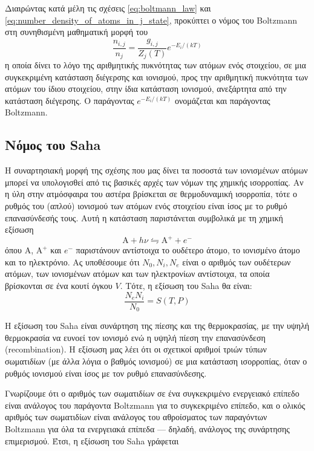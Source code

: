 Διαιρώντας κατά μέλη τις σχέσεις \eqref{eq:boltmann_law} και \eqref{eq:number_density_of_atoms_in_j_state}, προκύπτει ο νόμος του Boltzmann στη συνηθισμένη μαθηματική μορφή του
\begin{equation}
    \label{eq:boltzmann_law_general}
    \frac{n_{i,j}}{n_j} = \frac{g_{i,j}}{Z_{j}(T)} e^{-E_i/(kT)}
\end{equation}
η οποία δίνει το λόγο της αριθμητικής πυκνότητας των ατόμων ενός στοιχείου, σε μια συγκεκριμένη κατάσταση διέγερσης και ιονισμού, προς την αριθμητική πυκνότητα των ατόμων του ίδιου στοιχείου, στην ίδια κατάσταση ιονισμού, ανεξάρτητα από την κατάσταση διέγερσης. Ο παράγοντας $e^{-E_i/(kT)}$ ονομάζεται και παράγοντας Boltzmann.



\subsection{Νόμος του Saha}
Η συναρτησιακή μορφή της σχέσης που μας δίνει τα ποσοστά των ιονισμένων ατόμων μπορεί να υπολογισθεί από τις βασικές αρχές των νόμων της χημικής ισορροπίας. Αν η ύλη στην ατμόσφαιρα του αστέρα βρίσκεται σε θερμοδυναμική ισορροπία, τότε ο ρυθμός του (απλού) ιονισμού των ατόμων ενός στοιχείου είναι ίσος με το ρυθμό επανασύνδεσής τους. Αυτή η κατάσταση παριστάνεται συμβολικά με τη χημική εξίσωση $$\text{A} + h\nu \leftrightharpoons \text{A}^+ + e^-$$ όπου $\text{A}$, $\text{A}^+$ και $e^-$ παριστάνουν αντίστοιχα το ουδέτερο άτομο, το ιονισμένο άτομο και το ηλεκτρόνιο. Ας υποθέσουμε ότι $N_0, N_i, N_e$ είναι ο αριθμός των ουδέτερων ατόμων, των ιονισμένων ατόμων και των ηλεκτρονίων αντίστοιχα, τα οποία βρίσκονται σε ένα κουτί όγκου $V$. Τότε, η εξίσωση του Saha θα είναι:
\begin{equation}
    \label{eq:saha_function}
    \frac{N_e N_i}{N_0} = S (T,P)
\end{equation}

Η εξίσωση του Saha είναι συνάρτηση της πίεσης και της θερμοκρασίας, με την υψηλή θερμοκρασία να ευνοεί τον ιονισμό ενώ η υψηλή πίεση την επανασύνδεση (recombination). Η εξίσωση μας λέει ότι οι σχετικοί αριθμοί τριών τύπων σωματιδίων (με άλλα λόγια ο βαθμός ιονισμού) σε μια κατάσταση ισορροπίας, όταν ο ρυθμός ιονισμού είναι ίσος με τον ρυθμό επανασύνδεσης.

Γνωρίζουμε ότι ο αριθμός των σωματιδίων σε ένα συγκεκριμένο ενεργειακό επίπεδο είναι ανάλογος του παράγοντα Boltzmann για το συγκεκριμένο επίπεδο, και ο ολικός αριθμός των σωματιδίων είναι ανάλογος του αθροίσματος των παραγόντων Boltzmann για όλα τα ενεργειακά επίπεδα --- δηλαδή, ανάλογος της συνάρτησης επιμερισμού. Έτσι, η εξίσωση του Saha γράφεται


